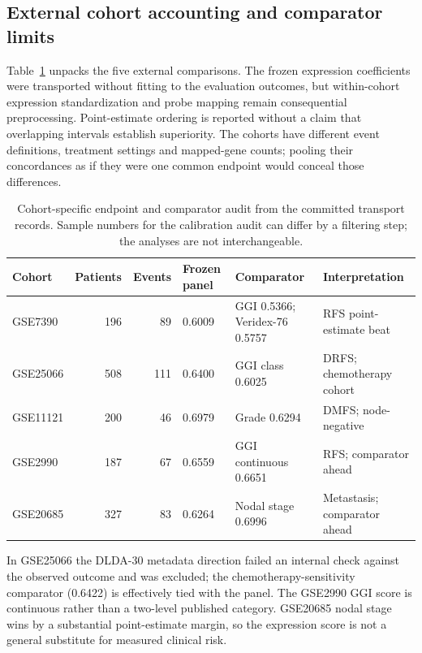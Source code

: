 \subsection{External cohort accounting and comparator limits}
Table~\ref{tab:transport-audit} unpacks the five external comparisons. The frozen expression coefficients were transported without fitting to the evaluation outcomes, but within-cohort expression standardization and probe mapping remain consequential preprocessing. Point-estimate ordering is reported without a claim that overlapping intervals establish superiority. The cohorts have different event definitions, treatment settings and mapped-gene counts; pooling their concordances as if they were one common endpoint would conceal those differences.
\begin{table}[htbp]\centering\footnotesize
\begin{tabular}{lrrllp{1.25in}}\hline
Cohort & Patients & Events & Frozen panel & Comparator & Interpretation \\ \hline
GSE7390 & 196 & 89 & 0.6009 & GGI 0.5366; Veridex-76 0.5757 & RFS point-estimate beat \\
GSE25066 & 508 & 111 & 0.6400 & GGI class 0.6025 & DRFS; chemotherapy cohort \\
GSE11121 & 200 & 46 & 0.6979 & Grade 0.6294 & DMFS; node-negative \\
GSE2990 & 187 & 67 & 0.6559 & GGI continuous 0.6651 & RFS; comparator ahead \\
GSE20685 & 327 & 83 & 0.6264 & Nodal stage 0.6996 & Metastasis; comparator ahead \\
\hline\end{tabular}
\caption{Cohort-specific endpoint and comparator audit from the committed transport records. Sample numbers for the calibration audit can differ by a filtering step; the analyses are not interchangeable.}\label{tab:transport-audit}
\end{table}
\par In GSE25066 the DLDA-30 metadata direction failed an internal check against the observed outcome and was excluded; the chemotherapy-sensitivity comparator (0.6422) is effectively tied with the panel. The GSE2990 GGI score is continuous rather than a two-level published category. GSE20685 nodal stage wins by a substantial point-estimate margin, so the expression score is not a general substitute for measured clinical risk.
